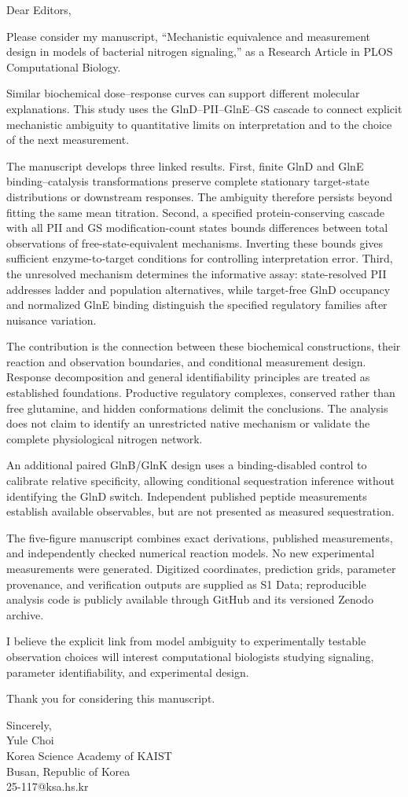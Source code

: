 \documentclass[11pt,a4paper]{article}
\begin{document}
Dear Editors,

Please consider my manuscript, ``Mechanistic equivalence and measurement design in models of bacterial nitrogen signaling,'' as a Research Article in PLOS Computational Biology.

Similar biochemical dose--response curves can support different molecular explanations. This study uses the GlnD--PII--GlnE--GS cascade to connect explicit mechanistic ambiguity to quantitative limits on interpretation and to the choice of the next measurement.

The manuscript develops three linked results. First, finite GlnD and GlnE binding--catalysis transformations preserve complete stationary target-state distributions or downstream responses. The ambiguity therefore persists beyond fitting the same mean titration. Second, a specified protein-conserving cascade with all PII and GS modification-count states bounds differences between total observations of free-state-equivalent mechanisms. Inverting these bounds gives sufficient enzyme-to-target conditions for controlling interpretation error. Third, the unresolved mechanism determines the informative assay: state-resolved PII addresses ladder and population alternatives, while target-free GlnD occupancy and normalized GlnE binding distinguish the specified regulatory families after nuisance variation.

The contribution is the connection between these biochemical constructions, their reaction and observation boundaries, and conditional measurement design. Response decomposition and general identifiability principles are treated as established foundations. Productive regulatory complexes, conserved rather than free glutamine, and hidden conformations delimit the conclusions. The analysis does not claim to identify an unrestricted native mechanism or validate the complete physiological nitrogen network.

An additional paired GlnB/GlnK design uses a binding-disabled control to calibrate relative specificity, allowing conditional sequestration inference without identifying the GlnD switch. Independent published peptide measurements establish available observables, but are not presented as measured sequestration.

The five-figure manuscript combines exact derivations, published measurements, and independently checked numerical reaction models. No new experimental measurements were generated. Digitized coordinates, prediction grids, parameter provenance, and verification outputs are supplied as S1 Data; reproducible analysis code is publicly available through GitHub and its versioned Zenodo archive.

I believe the explicit link from model ambiguity to experimentally testable observation choices will interest computational biologists studying signaling, parameter identifiability, and experimental design.

Thank you for considering this manuscript.

Sincerely,\\Yule Choi\\Korea Science Academy of KAIST\\Busan, Republic of Korea\\25-117@ksa.hs.kr
\end{document}

